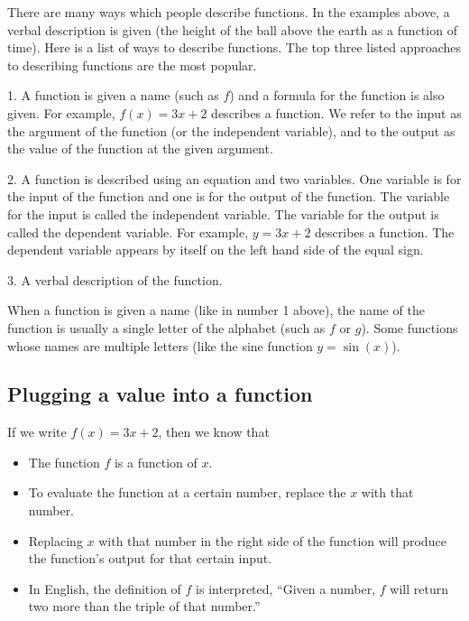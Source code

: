 There are many ways which people describe functions. In the examples above, a verbal
description is given (the height of the ball above the earth as a function of time). Here
is a list of ways to describe functions. The top three listed approaches to describing
functions are the most popular.

1. A function is given a name (such as $f$) and a formula for the function is also given. For example, $f(x) = 3x + 2$ describes a function. We refer to the input as the argument of the function (or the independent variable), and to the output as the value of the function at the given argument.

2. A function is described using an equation and two variables. One variable is for the input of the function and one is for the output of the function. The variable for the input is called the independent variable. The variable for the output is called the dependent variable. For example, $y = 3x + 2$ describes a function. The dependent variable appears by itself on the left hand side of the equal sign.

3. A verbal description of the function.

When a function is given a name (like in number 1 above), the name of the function is usually a single letter of the alphabet (such as $f$ or $g$). Some functions whose names are multiple letters (like the sine function $y = \sin(x)$).

\subsection{Plugging a value into a function}
\label{sss:plug-50c6}

If we write $f(x) = 3x + 2$, then we know that

\begin{itemize}
    \item The function $f$ is a function of $x$.
    \item To evaluate the function at a certain number, replace the $x$ with that number.
    \item Replacing $x$ with that number in the right side of the function will produce the function's output for that certain input.
    \item In English, the definition of $f$ is interpreted, ``Given a number, $f$ will return two more than the triple of that number.''
\end{itemize}

